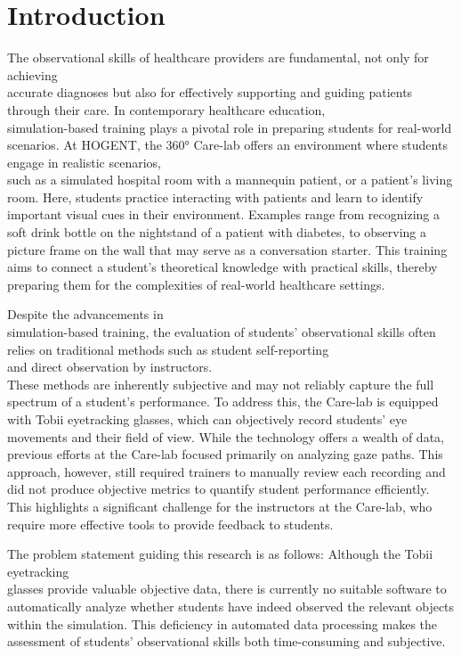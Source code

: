 \documentclass[english]{hogent-article}
\begin{document}
\section{Introduction}
\label{sec:Introduction}

The observational skills of healthcare providers are fundamental, not only for achieving\\ accurate diagnoses but also for effectively supporting and guiding patients through their care.
In contemporary healthcare education,\\ simulation-based training plays a pivotal role in preparing students for real-world scenarios.
At HOGENT, the 360° Care-lab offers an environment where students engage in realistic scenarios,\\ such as a simulated hospital room with a mannequin patient, or a patient's living room.
Here, students practice interacting with patients and learn to identify important visual cues in their environment.
Examples range from recognizing a soft drink bottle on the nightstand of a patient with diabetes, to observing a picture frame on the wall that may serve as a conversation starter.
This training aims to connect a student's theoretical knowledge with practical skills, thereby preparing them for the complexities of real-world healthcare settings.

Despite the advancements in\\ simulation-based training, the evaluation of students' observational skills often relies on traditional methods such as student self-reporting\\ and direct observation by instructors.\\
These methods are inherently subjective and may not reliably capture the full spectrum of a student's performance.
To address this, the Care-lab is equipped with Tobii eyetracking glasses, which can objectively record students' eye movements and their field of view. 
While the technology offers a wealth of data, previous efforts at the Care-lab focused primarily on analyzing gaze paths.
This approach, however, still required trainers to manually review each recording and did not produce objective metrics to quantify student performance efficiently.
This highlights a significant challenge for the instructors at the Care-lab, who require more effective tools to provide feedback to students.

The problem statement guiding this research is as follows: Although the Tobii eyetracking\\ glasses provide valuable objective data, there is currently no suitable software to automatically analyze whether
students have indeed observed the relevant objects within the simulation. This deficiency in automated data processing makes the assessment of students' observational skills both time-consuming and subjective.
\end{document}
